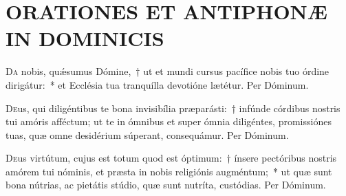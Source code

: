 \documentclass[vesperale_romanum.tex]{subfiles}
\begin{document}

\section*{ORATIONES ET ANTIPHONÆ IN DOMINICIS}

\subtitle{per ordinem dispositæ a quarta post Pentecosten usque ad Adventum.}





\oratio

\lettrine{D}{a} nobis, quǽsumus Dómine,~† ut et mundi cursus pacífice nobis tuo órdine dirigátur:~* et Ecclésia tua tranquílla devotióne lætétur. Per Dóminum.



\oratio

\lettrine{D}{e}us, qui diligéntibus te bona invisibília præparásti:~† infúnde córdibus nostris tui amóris afféctum; ut te in ómnibus et super ómnia diligéntes, promissiónes tuas, quæ omne desidérium súperant, consequámur. Per Dóminum.



\oratio

\lettrine{D}{e}us virtútum, cujus est totum quod est óptimum:~† ínsere pectóribus nostris amórem tui nóminis, et præsta in nobis religiónis augméntum;~* ut quæ sunt bona nútrias, ac pietátis stúdio, quæ sunt nutríta, custódias.
Per Dóminum.



\oratio
\end{document}
